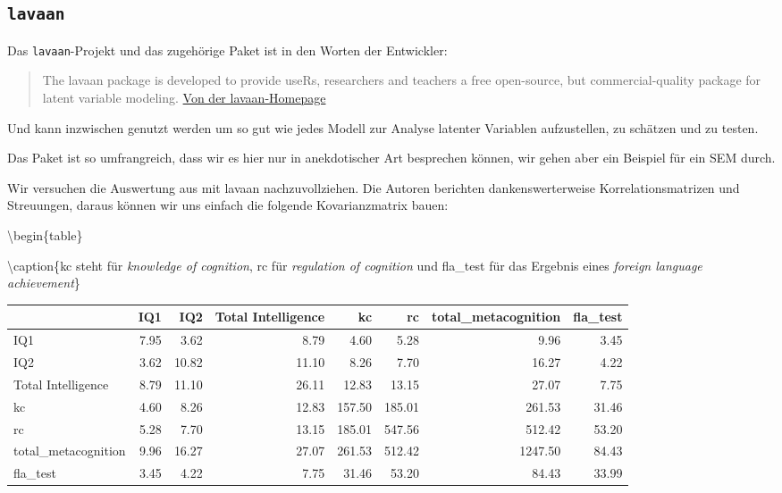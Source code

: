 \documentclass[
]{book}
\begin{document}
\hypertarget{lavaan}{%
\subsection{\texorpdfstring{\texttt{lavaan}}{lavaan}}\label{lavaan}}

Das \texttt{lavaan}-Projekt und das zugehörige Paket ist in den Worten der Entwickler:

\begin{quote}
The lavaan package is developed to provide useRs, researchers and teachers a free open-source, but commercial-quality package for latent variable modeling. \href{https://lavaan.ugent.be/index.html}{Von der lavaan-Homepage}
\end{quote}

Und kann inzwischen genutzt werden um so gut wie jedes Modell zur Analyse latenter Variablen aufzustellen, zu schätzen und zu testen.

Das Paket ist so umfrangreich, dass wir es hier nur in anekdotischer Art besprechen können, wir gehen aber ein Beispiel für ein SEM durch.

Wir versuchen die Auswertung aus \citet{pishghadamIntelligenceMetacognitionPredictors2013} mit lavaan nachzuvollziehen. Die Autoren berichten dankenswerterweise Korrelationsmatrizen und Streuungen, daraus können wir uns einfach die folgende Kovarianzmatrix bauen:

\textbackslash begin\{table\}

\textbackslash caption\{\label{tab:unnamed-chunk-123}kc steht für \emph{knowledge of cognition}, rc für \emph{regulation of cognition} und fla\_test für das Ergebnis eines \emph{foreign language achievement}\}
\centering

\begin{tabular}[t]{lrrrrrrr}
\toprule
  & IQ1 & IQ2 & Total Intelligence & kc & rc & total\_metacognition & fla\_test\\
\midrule
IQ1 & 7.95 & 3.62 & 8.79 & 4.60 & 5.28 & 9.96 & 3.45\\
IQ2 & 3.62 & 10.82 & 11.10 & 8.26 & 7.70 & 16.27 & 4.22\\
Total Intelligence & 8.79 & 11.10 & 26.11 & 12.83 & 13.15 & 27.07 & 7.75\\
kc & 4.60 & 8.26 & 12.83 & 157.50 & 185.01 & 261.53 & 31.46\\
rc & 5.28 & 7.70 & 13.15 & 185.01 & 547.56 & 512.42 & 53.20\\
\addlinespace
total\_metacognition & 9.96 & 16.27 & 27.07 & 261.53 & 512.42 & 1247.50 & 84.43\\
fla\_test & 3.45 & 4.22 & 7.75 & 31.46 & 53.20 & 84.43 & 33.99\\
\bottomrule
\end{tabular}
\end{document}
